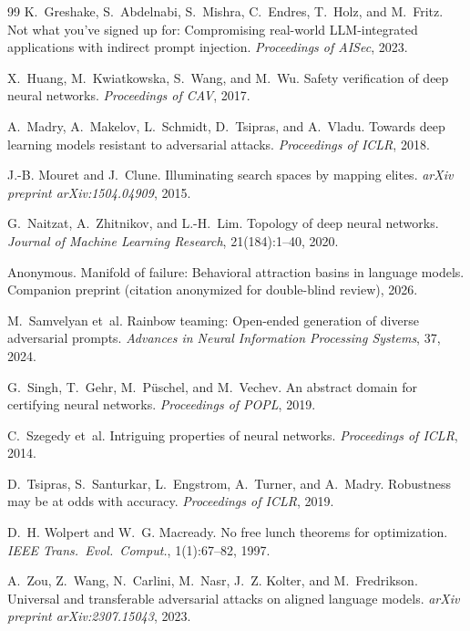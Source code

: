 \documentclass[11pt]{article}
\begin{document}
\begin{thebibliography}{99}
K.~Greshake, S.~Abdelnabi, S.~Mishra, C.~Endres, T.~Holz, and M.~Fritz.
\newblock Not what you've signed up for: Compromising real-world
  {LLM}-integrated applications with indirect prompt injection.
\newblock \emph{Proceedings of AISec}, 2023.

X.~Huang, M.~Kwiatkowska, S.~Wang, and M.~Wu.
\newblock Safety verification of deep neural networks.
\newblock \emph{Proceedings of CAV}, 2017.

A.~Madry, A.~Makelov, L.~Schmidt, D.~Tsipras, and A.~Vladu.
\newblock Towards deep learning models resistant to adversarial attacks.
\newblock \emph{Proceedings of ICLR}, 2018.

J.-B. Mouret and J.~Clune.
\newblock Illuminating search spaces by mapping elites.
\newblock \emph{arXiv preprint arXiv:1504.04909}, 2015.

G.~Naitzat, A.~Zhitnikov, and L.-H.~Lim.
\newblock Topology of deep neural networks.
\newblock \emph{Journal of Machine Learning Research}, 21(184):1--40, 2020.

Anonymous.
\newblock Manifold of failure: Behavioral attraction basins in language
  models.
\newblock Companion preprint (citation anonymized for double-blind
  review), 2026.

M.~Samvelyan et~al.
\newblock Rainbow teaming: Open-ended generation of diverse adversarial
  prompts.
\newblock \emph{Advances in Neural Information Processing Systems}, 37,
2024.

G.~Singh, T.~Gehr, M.~P{\"u}schel, and M.~Vechev.
\newblock An abstract domain for certifying neural networks.
\newblock \emph{Proceedings of POPL}, 2019.

C.~Szegedy et~al.
\newblock Intriguing properties of neural networks.
\newblock \emph{Proceedings of ICLR}, 2014.

D.~Tsipras, S.~Santurkar, L.~Engstrom, A.~Turner, and A.~Madry.
\newblock Robustness may be at odds with accuracy.
\newblock \emph{Proceedings of ICLR}, 2019.

D.~H. Wolpert and W.~G. Macready.
\newblock No free lunch theorems for optimization.
\newblock \emph{IEEE Trans.\ Evol.\ Comput.}, 1(1):67--82, 1997.

A.~Zou, Z.~Wang, N.~Carlini, M.~Nasr, J.~Z. Kolter, and
M.~Fredrikson.
\newblock Universal and transferable adversarial attacks on aligned
  language models.
\newblock \emph{arXiv preprint arXiv:2307.15043}, 2023.


\end{thebibliography}
\end{document}
